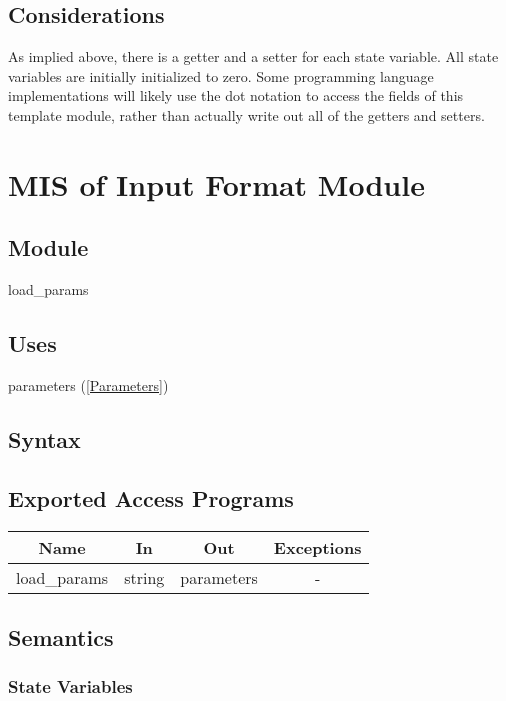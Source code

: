 \documentclass[12pt]{article}
\begin{document}
\subsection{Considerations}

As implied above, there is a getter and a setter for each state variable.  All
state variables are initially initialized to zero.  Some programming language
implementations will likely use the dot notation to access the fields of this
template module, rather than actually write out all of the getters and setters.

\section{MIS of Input Format Module} \label{Load}

\subsection{Module}

load\_params

\subsection{Uses}

parameters (\ref{Parameters})

\subsection{Syntax}

\subsection{Exported Access Programs}

\begin{center}
\begin{tabular}{c c c c}
\hline
\textbf{Name} & \textbf{In} & \textbf{Out} & \textbf{Exceptions} \\
\hline
load\_params & string & parameters &  - \\
\hline
\end{tabular}
\end{center}

\subsection{Semantics}

\subsubsection{State Variables}
\end{document}
